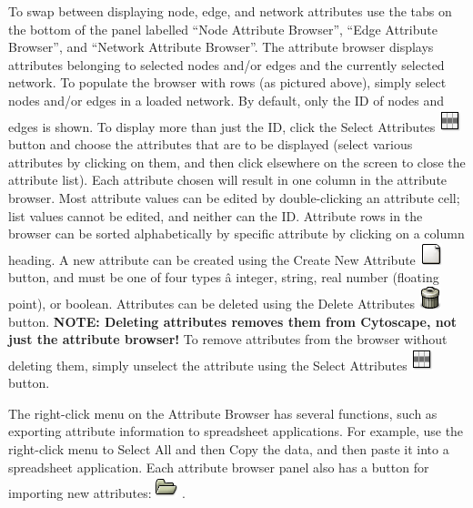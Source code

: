 To swap between displaying node, edge, and network attributes use the tabs on the bottom of the panel labelled ``Node Attribute Browser'', ``Edge Attribute Browser'', and ``Network Attribute Browser''. The attribute browser displays attributes belonging to selected nodes and/or edges and the currently selected network. To populate the browser with rows (as pictured above), simply select nodes and/or edges in a loaded network. By default, only the ID of nodes and edges is shown. To display more than just the ID, click the Select Attributes \includegraphics[scale=1]{images/attributes_select_icon.png}  button and choose the attributes that are to be displayed (select various attributes by clicking on them, and then click elsewhere on the screen to close the attribute list). Each attribute chosen will result in one column in the attribute browser. Most attribute values can be edited by double-clicking an attribute cell; list values cannot be edited, and neither can the ID. Attribute rows in the browser can be sorted alphabetically by specific attribute by clicking on a column heading. A new attribute can be created using the Create New Attribute \includegraphics[scale=1]{images/attributes_new_icon.png}  button, and must be one of four types \^a integer, string, real number (floating point), or boolean. Attributes can be deleted using the Delete Attributes \includegraphics[scale=1]{images/attributes_delete_icon.png}  button. \textbf{NOTE: Deleting attributes removes them from Cytoscape, not just the attribute browser!}
 To remove attributes from the browser without deleting them, simply unselect the attribute using the Select Attributes \includegraphics[scale=1]{images/attributes_select_icon.png}  button. 


 The right-click menu on the Attribute Browser has several functions, such as exporting attribute information to spreadsheet applications. For example, use the right-click menu to Select All and then Copy the data, and then paste it into a spreadsheet application. Each attribute browser panel also has a button for importing new attributes: \includegraphics[scale=1]{images/attributes_import_icon.png}  . 



